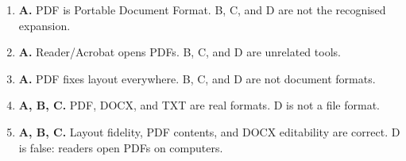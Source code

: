 \documentclass[11pt]{article}
\begin{document}
\begin{enumerate}[label=\textbf{Q\arabic*.}, leftmargin=*]
\item \textbf{A.} PDF is Portable Document Format. B, C, and D are not the recognised expansion.
\item \textbf{A.} Reader/Acrobat opens PDFs. B, C, and D are unrelated tools.
\item \textbf{A.} PDF fixes layout everywhere. B, C, and D are not document formats.
\item \textbf{A, B, C.} PDF, DOCX, and TXT are real formats. D is not a file format.
\item \textbf{A, B, C.} Layout fidelity, PDF contents, and DOCX editability are correct. D is false: readers open PDFs on computers.
\end{enumerate}
\def\JKSSBLessonID{33}\def\JKSSBAnswers{1}
\end{document}
